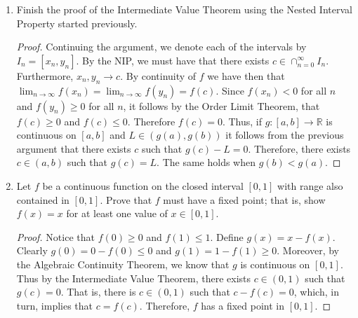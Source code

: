 \begin{enumerate}
    \item Finish the proof of the Intermediate Value Theorem using the Nested Interval Property started previously.
    \begin{proof}
    Continuing the argument, we denote each of the intervals by \( I_{n} = [x_{n},y_{n}] \). By the NIP, we must have that there exists \( c \in \cap_{n=0}^{\infty} I_{n}\). Furthermore, \( x_{n},y_{n} \rightarrow c \). By continuity of \( f \) we have then that \( \lim_{n \rightarrow \infty} f(x_{n}) = \lim_{n \rightarrow \infty} f(y_{n}) = f(c) \).  Since \( f(x_{n}) < 0 \) for all \( n \) and \( f(y_{n}) \geq 0 \) for all \( n \), it follows by the Order Limit Theorem, that \( f(c) \geq 0 \) and \( f(c) \leq 0 \). Therefore \( f(c) = 0 \). Thus, if \( g: [a,b] \rightarrow \mathbb{R} \) is continuous on \( [a,b] \) and \( L \in (g(a),g(b)) \) it follows from the previous argument that there exists \( c \) such that \( g(c) - L = 0 \). Therefore, there exists \( c \in (a,b) \) such that \( g(c) = L \). The same holds when \( g(b) < g(a) \). 
    \end{proof}
    
    \item Let \( f \) be a continuous function on the closed interval \( [0,1] \) with range also contained in \( [0,1] \). Prove that \( f \) must have a fixed point; that is, show \( f(x) = x \) for at least one value of \( x \in [0,1] \).
    
    \begin{proof}
    Notice that \( f(0) \geq 0 \) and \( f(1) \leq 1 \). Define \( g(x) = x - f(x) \). Clearly \( g(0) = 0 - f(0) \leq 0 \) and \( g(1) = 1 - f(1) \geq 0 \). Moreover, by the Algebraic Continuity Theorem, we know that \( g \) is continuous on \( [0,1] \). Thus by the Intermediate Value Theorem, there exists \( c \in (0,1) \) such that \( g(c) = 0 \). That is, there is \( c \in (0,1) \) such that \( c - f(c) = 0 \), which, in turn, implies that \( c = f(c) \). Therefore, \( f \) has a fixed point in \( [0,1] \).
    \end{proof}
    
    
    
    
    
    
    
    
    
    
    
    
    
    
    
    
    
    
    
    
    
    
    
    
    
    
    
    
    
    
\end{enumerate}